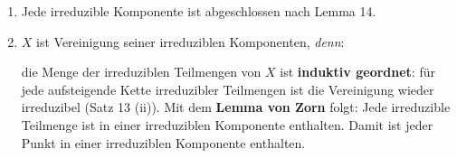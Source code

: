 \begin{rem}
  \label{rem:irreduzibel}
  \mbox{}
  \begin{enumerate}
  \item Jede irreduzible Komponente ist abgeschlossen nach Lemma 14.
  \item $X$ ist Vereinigung seiner irreduziblen Komponenten, \emph{denn}: 

    die Menge der irreduziblen Teilmengen von $X$ ist \textbf{induktiv
      geordnet}: für jede aufsteigende Kette irreduzibler Teilmengen ist
    die Vereinigung wieder irreduzibel (Satz 13 (ii)). Mit dem \textbf{Lemma
      von Zorn} folgt: Jede irreduzible Teilmenge ist in einer irreduziblen
    Komponente enthalten. Damit ist jeder Punkt in einer irreduziblen
    Komponente enthalten.
  \end{enumerate}
\end{rem}


